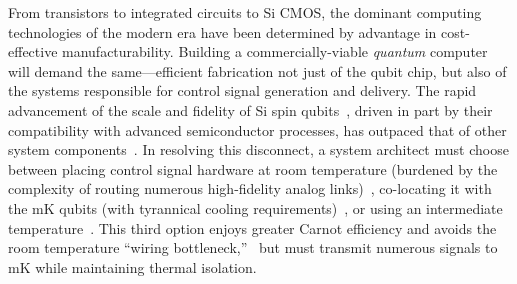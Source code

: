 \documentclass[aps,prl,twocolumn,superscriptaddress,nobibnotes,10pt,floatfix]{revtex4-2}
\begin{document}
	\maketitle



	From transistors to integrated circuits to Si CMOS, the dominant computing technologies of the modern era have been determined by advantage in cost-effective manufacturability.
	Building a commercially-viable \emph{quantum} computer will demand the same---efficient fabrication not just of the qubit chip, but also of the systems responsible for control signal generation and delivery.
	The rapid advancement of the scale and fidelity of Si spin qubits~\cite{
		mills_two-qubit_2022,
		stano_review_2022,
		burkard_semiconductor_2023,
		madzik_operating_2025,
		steinacker_industry-compatible_2025,
		wu_simultaneous_2025,
		takeda_quantum_2022,
		undseth_weight-four_2026},
	driven in part by their compatibility with advanced semiconductor processes, has outpaced that of other system components~\cite{
		xue_cmos-based_2021,
		patra_cryo-cmos_2018,
		mehrpoo_benefits_2019,
		geck_control_2019,
		pauka_cryogenic_2021,
		bartee_spin-qubit_2025,
		kiene_134_2021}.
	In resolving this disconnect, a system architect must choose between placing control signal hardware at room temperature (burdened by the complexity of routing numerous high-fidelity analog links)~\cite{
		mills_two-qubit_2022,
		zwerver_qubits_2022,
		steinacker_industry-compatible_2025,
		madzik_operating_2025,
		steinacker_industry-compatible_2025,
		wu_simultaneous_2025,
		takeda_quantum_2022,
		undseth_weight-four_2026},
	co-locating it with the mK qubits (with tyrannical cooling requirements)~\cite{bartee_spin-qubit_2025,jordan_quantum_2026},
	or using an intermediate temperature~\cite{
		xue_cmos-based_2021,
		patra_cryo-cmos_2018,
		mehrpoo_benefits_2019,
		geck_control_2019,
		franke_rents_2019,
		pauka_cryogenic_2021,
		tien_222_2026}.
	This third option enjoys greater Carnot efficiency and avoids the room temperature ``wiring bottleneck,''~\cite{franke_rents_2019} but must transmit numerous signals to mK while maintaining thermal isolation.
\end{document}
